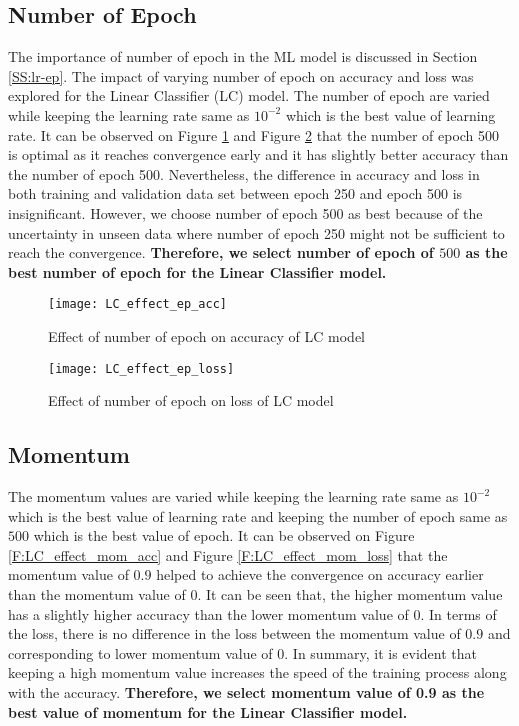 \documentclass[12pt, a4paper, twoside]{article}
\begin{document}
\subsection{Number of Epoch}\label{SS:lc-ep}
The importance of number of epoch in the ML model is discussed in Section \ref{SS:lr-ep}. The impact of varying number of epoch on accuracy and loss was explored for the Linear Classifier (LC) model. The number of epoch are varied while keeping the learning rate same as $10^{-2}$ which is the best value of learning rate. It can be observed on Figure \ref{F:LC_effect_ep_acc} and Figure \ref{F:LC_effect_ep_loss} that the number of epoch 500 is optimal as it reaches convergence early and it has slightly better accuracy than the number of epoch 500. Nevertheless, the difference in accuracy and loss in both training and validation data set between epoch 250 and epoch 500 is insignificant. However, we choose number of epoch 500 as best because of the uncertainty in unseen data where number of epoch 250 might not be sufficient to reach the convergence. \textbf{Therefore, we select number of epoch of $500$ as the best number of epoch for the Linear Classifier model.}

\begin{figure}[h!]
	\centering
	\texttt{[image: LC\_effect\_ep\_acc]}
	\caption{Effect of number of epoch on  accuracy of LC model}
	\label{F:LC_effect_ep_acc}
\end{figure}
\begin{figure}[h!]
	\centering
	\texttt{[image: LC\_effect\_ep\_loss]}
	\caption{Effect of number of epoch on loss of LC model}
	\label{F:LC_effect_ep_loss}
\end{figure}

\subsection{Momentum}\label{SS:lc-mom}
The momentum values are varied while keeping the learning rate same as $10^{-2}$ which is the best value of learning rate and keeping the number of epoch same as $500$ which is the best value of epoch. It can be observed on Figure \ref{F:LC_effect_mom_acc} and Figure \ref{F:LC_effect_mom_loss} that the momentum value of $0.9$ helped to achieve the convergence on accuracy earlier than the momentum value of 0. It can be seen that, the higher momentum value has a slightly higher accuracy than the lower momentum value of 0. In terms of the loss, there is no difference in the loss between the momentum value of $0.9$ and corresponding to lower momentum value of 0. In summary, it is evident that keeping a high momentum value increases the speed of the training process along with the accuracy. \textbf{Therefore, we select momentum value of 0.9 as the best value of momentum for the Linear Classifier model.} 
\end{document}
